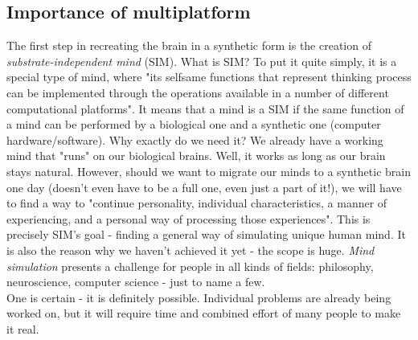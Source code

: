 \documentclass[12pt]{article}
\begin{document}
\subsection{Importance of multiplatform}
	The first step in recreating the brain in a synthetic form is the creation of \emph{substrate-independent mind} (SIM). What is SIM? To put it quite simply, it is a special type of mind, where "its selfsame functions that represent thinking process can be implemented through the operations available in a number of different computational platforms"\cite{sim:1}. It means that a mind is a SIM if the same function of a mind can be performed by a biological one and a synthetic one (computer hardware/software). Why exactly do we need it? We already have a working mind that "runs" on our biological brains. Well, it works as long as our brain stays natural. However, should we want to migrate our minds to a synthetic brain one day (doesn't even have to be a full one, even just a part of it!), we will have to find a way to "continue personality, individual characteristics, a manner of experiencing, and a personal way of processing those experiences"\cite{sim:2}\cite{sim:3}. This is precisely SIM's goal - finding a general way of simulating unique human mind. It is also the reason why we haven't achieved it yet - the scope is huge. \emph{Mind simulation} presents a challenge for people in all kinds of fields: philosophy, neuroscience, computer science - just to name a few.
	\\One is certain - it is definitely possible. Individual problems are already being worked on, but it will require time and combined effort of many people to make it real.
\end{document}
